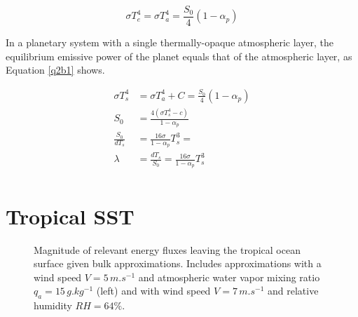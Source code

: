 \documentclass[12pt]{article}
\begin{document}
\begin{equation}\label{q2b2}
    \sigma T_e^4 = \sigma T_a^4 = \frac{S_0}{4}(1-\alpha_p)
\end{equation}

In a planetary system with a single thermally-opaque atmospheric layer, the equilibrium emissive power of the planet equals that of the atmospheric layer, as Equation \ref{q2b1} shows.

\begin{equation}\label{q2b3}
    \begin{split}
        \sigma T_s^4 &= \sigma T_a^4 + C = \frac{S_0}{4}(1-\alpha_p) \\
        S_0 &= \frac{4(\sigma T_s^4 - c)}{1-\alpha_p} \\
        \frac{S_0}{dT_s} &= \frac{16\sigma}{1-\alpha_p}T_s^3 = \\
        \lambda &= \frac{dT_s}{S_0} = \frac{16\sigma}{1-\alpha_p}T_s^3 \\
    \end{split}
\end{equation}



\section{Tropical SST}

\begin{figure}[h!]\label{seaflux}
    \centering
    \caption{Magnitude of relevant energy fluxes leaving the tropical ocean surface given bulk approximations. Includes approximations with a wind speed $V = 5\,\si{m.s^{-1}}$ and atmospheric water vapor mixing ratio $q_a = 15\,\si{g.kg^{-1}}$ (left) and with wind speed $V = 7 \,\si{m.s^{-1}}$ and relative humidity $RH=64\%$.}
\end{figure}
\end{document}

